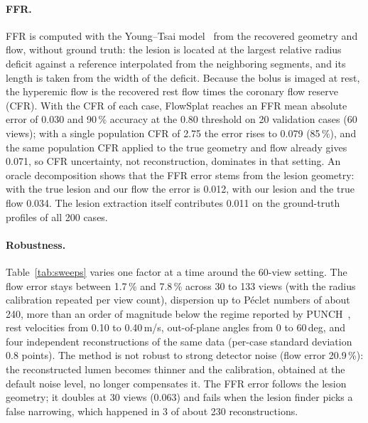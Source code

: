 
\paragraph{FFR.}
FFR is computed with the Young--Tsai model~\cite{young1973flow} from the
recovered geometry and flow, without ground truth: the lesion is located
at the largest relative radius deficit against a reference interpolated
from the neighboring segments, and its length is taken from the width of
the deficit. Because the bolus is imaged at rest, the hyperemic flow is the
recovered rest flow times the coronary flow reserve (CFR). With the CFR of
each case, FlowSplat reaches an FFR mean absolute error of 0.030 and 90\,\%
accuracy at the 0.80 threshold on 20 validation cases (60 views); with a
single population CFR of 2.75 the error rises to 0.079 (85\,\%), and the
same population CFR applied to the true geometry and flow already gives
0.071, so CFR uncertainty, not reconstruction, dominates in that setting.
An oracle decomposition shows that the FFR error stems from the lesion
geometry: with the true lesion and our flow the error is 0.012, with our
lesion and the true flow 0.034. The lesion extraction itself contributes
0.011 on the ground-truth profiles of all 200 cases.

\paragraph{Robustness.}
Table~\ref{tab:sweeps} varies one factor at a time around the 60-view
setting. The flow error stays between 1.7\,\% and 7.8\,\% across 30 to 133
views (with the radius calibration repeated per view count), dispersion up
to Péclet numbers of about 240, more than an order of magnitude below the
regime reported by PUNCH~\cite{thakur2026punch}, rest velocities from 0.10
to 0.40\,m/s, out-of-plane angles from 0 to 60\,deg, and four independent
reconstructions of the same data (per-case standard deviation 0.8 points).
The method is not robust to strong detector noise (flow error 20.9\,\%):
the reconstructed lumen becomes thinner and the calibration, obtained at
the default noise level, no longer compensates it. The FFR error follows
the lesion geometry; it doubles at 30 views (0.063) and fails when the
lesion finder picks a false narrowing, which happened in 3 of about 230
reconstructions.

